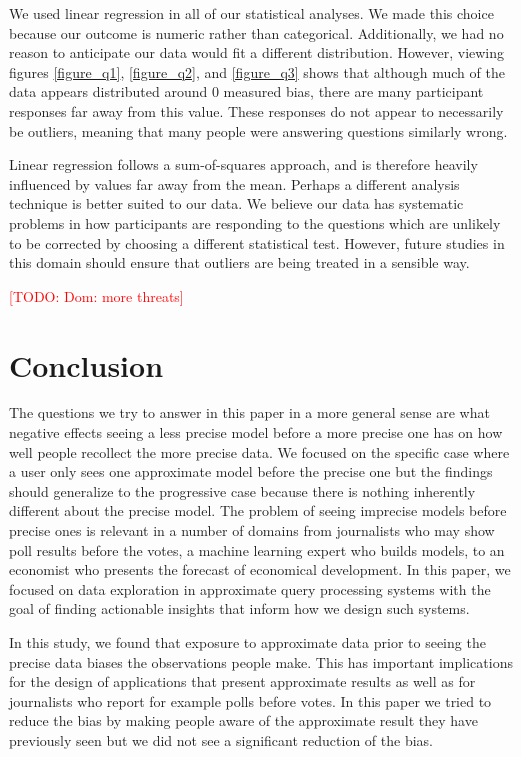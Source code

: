 \documentclass[10pt,journal,compsoc]{IEEEtran}
\newcommand{\note}[2]{\textcolor{#1}{[#2]}}
\newcommand{\todo}[1]{\note{red}{TODO: #1}}
\begin{document}
We used linear regression in all of our statistical analyses.
We made this choice because our outcome is numeric rather than categorical.
Additionally, we had no reason to anticipate our data would fit a different distribution.
However, viewing figures \ref{figure_q1}, \ref{figure_q2}, and \ref{figure_q3} shows that although much of the data appears distributed around 0 measured bias, there are many participant responses far away from this value.
These responses do not appear to necessarily be outliers, meaning that many people were answering questions similarly wrong.

Linear regression follows a sum-of-squares approach, and is therefore heavily influenced by values far away from the mean.
Perhaps a different analysis technique is better suited to our data.
We believe our data has systematic problems in how participants are responding to the questions which are unlikely to be corrected by choosing a different statistical test.
However, future studies in this domain should ensure that outliers are being treated in a sensible way.

\todo{Dom: more threats}

\section{Conclusion}

The questions we try to answer in this paper in a more general sense are what negative effects seeing a less precise model before a more precise one has on how well people recollect the more precise data.
We focused on the specific case where a user only sees one approximate model before the precise one but the findings should generalize to the progressive case because there is nothing inherently different about the precise model.
The problem of seeing imprecise models before precise ones is relevant in a number of domains from journalists who may show poll results before the votes, a machine learning expert who builds models, to an economist who presents the forecast of economical development.
In this paper, we focused on data exploration in approximate query processing systems with the goal of finding actionable insights that inform how we design such systems.

In this study, we found that exposure to approximate data prior to seeing the precise data biases the observations people make.
This has important implications for the design of applications that present approximate results as well as for journalists who report for example polls before votes.
In this paper we tried to reduce the bias by making people aware of the approximate result they have previously seen but we did not see a significant reduction of the bias.
\end{document}

